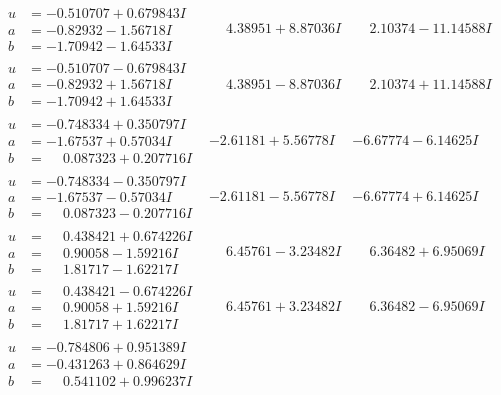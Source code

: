 \documentclass[1p]{elsarticle_modified}
\theoremstyle{definition}
\begin{document}
$$\begin{array}{c|c|c}
\begin{aligned}
u &= -0.510707 + 0.679843 I \\
a &= -0.82932 - 1.56718 I \\
b &= -1.70942 - 1.64533 I\end{aligned}
 & \phantom{-}4.38951 + 8.87036 I & \phantom{-}2.10374 - 11.14588 I \\ \hline\begin{aligned}
u &= -0.510707 - 0.679843 I \\
a &= -0.82932 + 1.56718 I \\
b &= -1.70942 + 1.64533 I\end{aligned}
 & \phantom{-}4.38951 - 8.87036 I & \phantom{-}2.10374 + 11.14588 I \\ \hline\begin{aligned}
u &= -0.748334 + 0.350797 I \\
a &= -1.67537 + 0.57034 I \\
b &= \phantom{-}0.087323 + 0.207716 I\end{aligned}
 & -2.61181 + 5.56778 I & -6.67774 - 6.14625 I \\ \hline\begin{aligned}
u &= -0.748334 - 0.350797 I \\
a &= -1.67537 - 0.57034 I \\
b &= \phantom{-}0.087323 - 0.207716 I\end{aligned}
 & -2.61181 - 5.56778 I & -6.67774 + 6.14625 I \\ \hline\begin{aligned}
u &= \phantom{-}0.438421 + 0.674226 I \\
a &= \phantom{-}0.90058 - 1.59216 I \\
b &= \phantom{-}1.81717 - 1.62217 I\end{aligned}
 & \phantom{-}6.45761 - 3.23482 I & \phantom{-}6.36482 + 6.95069 I \\ \hline\begin{aligned}
u &= \phantom{-}0.438421 - 0.674226 I \\
a &= \phantom{-}0.90058 + 1.59216 I \\
b &= \phantom{-}1.81717 + 1.62217 I\end{aligned}
 & \phantom{-}6.45761 + 3.23482 I & \phantom{-}6.36482 - 6.95069 I \\ \hline\begin{aligned}
u &= -0.784806 + 0.951389 I \\
a &= -0.431263 + 0.864629 I \\
b &= \phantom{-}0.541102 + 0.996237 I\end{aligned}

\end{array}$$
\end{document}
